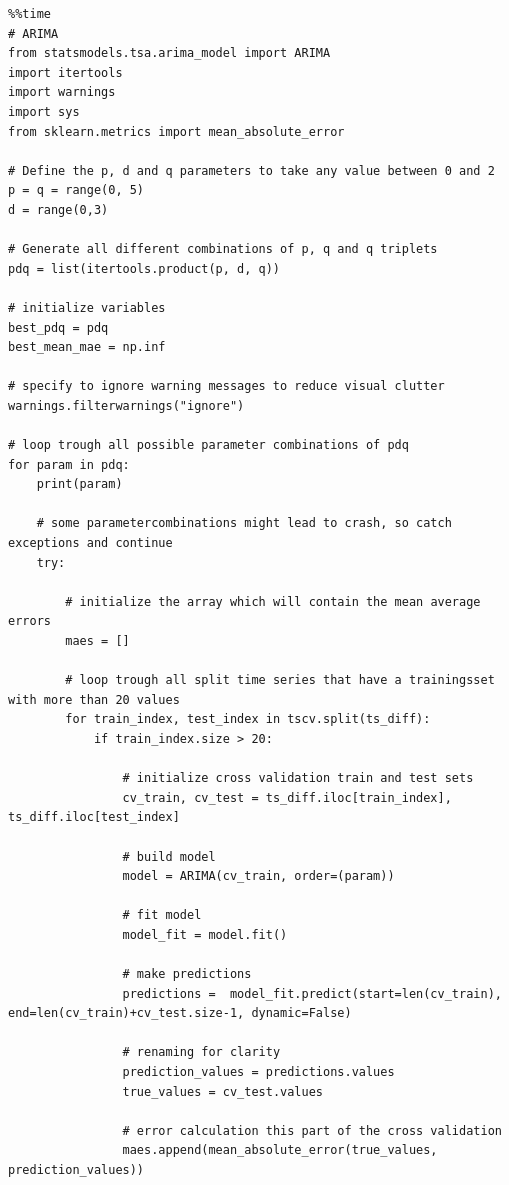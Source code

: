 \begin{verbatim}
%%time
# ARIMA
from statsmodels.tsa.arima_model import ARIMA
import itertools
import warnings
import sys
from sklearn.metrics import mean_absolute_error

# Define the p, d and q parameters to take any value between 0 and 2
p = q = range(0, 5)
d = range(0,3)

# Generate all different combinations of p, q and q triplets
pdq = list(itertools.product(p, d, q))

# initialize variables
best_pdq = pdq
best_mean_mae = np.inf

# specify to ignore warning messages to reduce visual clutter
warnings.filterwarnings("ignore") 

# loop trough all possible parameter combinations of pdq
for param in pdq:
    print(param)
    
    # some parametercombinations might lead to crash, so catch exceptions and continue
    try:  
        
        # initialize the array which will contain the mean average errors
        maes = []
        
        # loop trough all split time series that have a trainingsset with more than 20 values
        for train_index, test_index in tscv.split(ts_diff):
            if train_index.size > 20:
            
                # initialize cross validation train and test sets
                cv_train, cv_test = ts_diff.iloc[train_index], ts_diff.iloc[test_index]
                
                # build model
                model = ARIMA(cv_train, order=(param))
                
                # fit model
                model_fit = model.fit()
                
                # make predictions
                predictions =  model_fit.predict(start=len(cv_train), end=len(cv_train)+cv_test.size-1, dynamic=False)
                
                # renaming for clarity
                prediction_values = predictions.values
                true_values = cv_test.values
                
                # error calculation this part of the cross validation
                maes.append(mean_absolute_error(true_values, prediction_values))
            

\end{verbatim}
